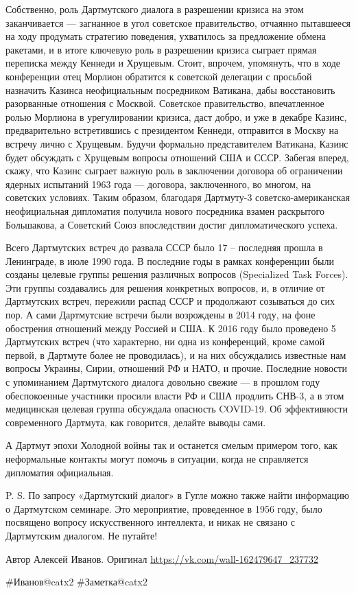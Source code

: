 Собственно, роль Дартмутского диалога в разрешении кризиса на этом заканчивается — загнанное в угол советское правительство, отчаянно пытавшееся на ходу продумать стратегию поведения, ухватилось за предложение обмена ракетами, и в итоге ключевую роль в разрешении кризиса сыграет прямая переписка между Кеннеди и Хрущевым. Стоит, впрочем, упомянуть, что в ходе конференции отец Морлион обратится к советской делегации с просьбой назначить Казинса неофициальным посредником Ватикана, дабы восстановить разорванные отношения с Москвой. Советское правительство, впечатленное ролью Морлиона в урегулировании кризиса, даст добро, и уже в декабре Казинс, предварительно встретившись с президентом Кеннеди, отправится в Москву на встречу лично с Хрущевым. Будучи формально представителем Ватикана, Казинс будет обсуждать с Хрущевым вопросы отношений США и СССР. Забегая вперед, скажу, что Казинс сыграет важную роль в заключении договора об ограничении ядерных испытаний 1963 года — договора, заключенного, во многом, на советских условиях. Таким образом, благодаря Дартмуту-3 советско-американская неофициальная дипломатия получила нового посредника взамен раскрытого Большакова, а Советский Союз впоследствии достиг дипломатического успеха.

Всего Дартмутских встреч до развала СССР было 17 – последняя прошла в Ленинграде, в июле 1990 года. В последние годы в рамках конференции были созданы целевые группы решения различных вопросов (Specialized Task Forces). Эти группы создавались для решения конкретных вопросов, и, в отличие от Дартмутских встреч, пережили распад СССР и продолжают созываться до сих пор. А сами Дартмутские встречи были возрождены в 2014 году, на фоне обострения отношений между Россией и США. К 2016 году было проведено 5 Дартмутских встреч (что характерно, ни одна из конференций, кроме самой первой, в Дартмуте более не проводилась), и на них обсуждались известные нам вопросы Украины, Сирии, отношений РФ и НАТО, и прочие. Последние новости с упоминанием Дартмутского диалога довольно свежие — в прошлом году обеспокоенные участники просили власти РФ и США продлить СНВ-3, а в этом медицинская целевая группа обсуждала опасность COVID-19. Об эффективности современного Дартмута, как говорится, делайте выводы сами.

А Дартмут эпохи Холодной войны так и останется смелым примером того, как неформальные контакты могут помочь в ситуации, когда не справляется дипломатия официальная.

P. S. По запросу «Дартмутский диалог» в Гугле можно также найти информацию о Дартмутском семинаре. Это мероприятие, проведенное в 1956 году, было посвящено вопросу искусственного интеллекта, и никак не связано с Дартмутским диалогом. Не путайте!

Автор Алексей Иванов.  Оригинал \url{https://vk.com/wall-162479647_237732}

\#Иванов@catx2
\#Заметка@catx2




